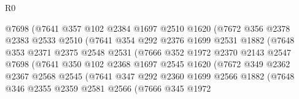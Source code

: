 \begin{lexlean}{R0}
\begin{coremodule}
                          @7698
                          (@7641
                            @357
                            @102
                            @2384
                            @1697
                            @2510
                            @1620
                            (@7672
                              @356
                              @2378
                              @2383
                              @2533
                              @2510
                              (@7641
                                @354
                                @292
                                @2376
                                @1699
                                @2531
                                @1882
                                (@7648
                                  @353
                                  @2371
                                  @2375
                                  @2548
                                  @2531
                                  (@7666
                                    @352
                                    @1972
                                    @2370
                                    @2143
                                    @2547
                                    @7698
                                    (@7641
                                      @350
                                      @102
                                      @2368
                                      @1697
                                      @2545
                                      @1620
                                      (@7672
                                        @349
                                        @2362
                                        @2367
                                        @2568
                                        @2545
                                        (@7641
                                          @347
                                          @292
                                          @2360
                                          @1699
                                          @2566
                                          @1882
                                          (@7648
                                            @346
                                            @2355
                                            @2359
                                            @2581
                                            @2566
                                            (@7666
                                              @345
                                              @1972

\end{coremodule}
\end{lexlean}
